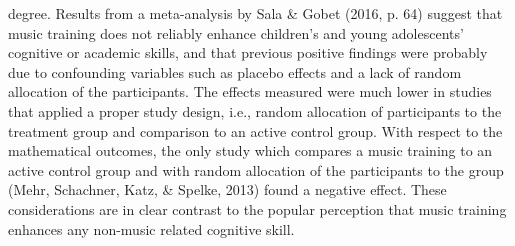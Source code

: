 \documentclass[a4, 12pt]{article}
\begin{document}
degree. Results from a meta-analysis by Sala \& Gobet (2016, p. 64) suggest that music training does not reliably enhance children's and young adolescents' cognitive or academic skills, and that previous positive findings were probably due to confounding variables such as placebo effects and a lack of random allocation of the participants. The effects measured were much lower in studies that applied a proper study design, i.e., random allocation of participants to the treatment group and comparison to an active control group. With respect to the mathematical outcomes, the only study which compares a music training to an active control group and with random allocation of the participants to the group (Mehr, Schachner, Katz, \& Spelke, 2013) found a negative effect. These considerations are in clear contrast to the popular perception that music training enhances any non-music related cognitive skill.
\end{document}
